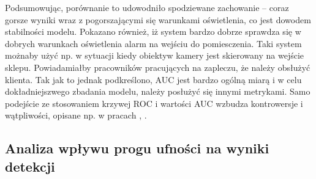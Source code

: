 Podsumowując, porównanie to udowodniło spodziewane zachowanie -- coraz gorsze wyniki wraz z pogorszającymi się warunkami oświetlenia, co jest dowodem stabilności modelu. Pokazano również, iż system bardzo dobrze sprawdza się w dobrych warunkach oświetlenia alarm na wejściu do pomiesczenia. Taki system możnaby użyć  np. w sytuacji kiedy obiektyw kamery jest skierowany na wejście sklepu. Powiadamiałby pracowników pracujących na zapleczu, że należy obsłużyć klienta.  
Tak jak to jednak podkreślono, AUC jest bardzo ogólną miarą i w celu dokładniejszwego zbadania modelu, należy posłużyć się innymi metrykami. Samo podejście ze stosowaniem krzywej ROC i wartości AUC wzbudza kontrowersje i wątpliwości, opisane np. w pracach \cite{AUC_critique1}, \cite{AUC_critique2}.






\subsection{Analiza wpływu progu ufności na wyniki detekcji}

